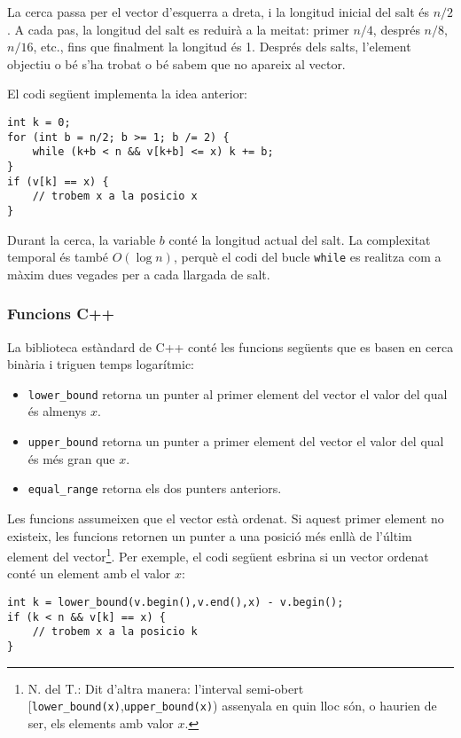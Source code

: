 La cerca passa per el vector d'esquerra a
dreta, i la longitud inicial del salt és $n/2$.
A cada pas, la longitud del salt es reduirà a la meitat:
primer $n/4$, després $n/8$, $n/16$, etc., fins que
finalment la longitud és 1.
Després dels salts, l'element objectiu o bé
s'ha trobat o bé sabem que no apareix al vector.

El codi següent implementa la idea anterior:
\begin{lstlisting}
int k = 0;
for (int b = n/2; b >= 1; b /= 2) {
    while (k+b < n && v[k+b] <= x) k += b;
}
if (v[k] == x) {
    // trobem x a la posicio x
}
\end{lstlisting}

Durant la cerca, la variable $b$
conté la longitud actual del salt.
La complexitat temporal és també $O(\log n)$,
perquè el codi del bucle \texttt{while}
es realitza com a màxim dues vegades per a cada llargada de salt.

\subsubsection{Funcions C++}

La biblioteca estàndard de C++ conté les funcions següents
que es basen en cerca binària i triguen temps logarítmic:

\begin{itemize}
\item \texttt{lower\_bound} retorna un punter al
primer element del vector el valor del qual és almenys $x$.
\item \texttt{upper\_bound} retorna un punter a
primer element del vector el valor del qual és més gran que $x$.
\item \texttt{equal\_range} retorna els dos punters anteriors.
\end{itemize}

Les funcions assumeixen que el vector està ordenat.
Si aquest primer element no existeix, les funcions retornen un
punter a una posició més enllà de l'últim element del vector\footnote{
N. del T.: Dit d'altra manera: l'interval semi-obert
[\texttt{lower\_bound(x)},\texttt{upper\_bound(x)})
  assenyala en quin lloc són, o haurien de ser, els elements amb
  valor $x$.}.
Per exemple, el codi següent esbrina si
un vector ordenat conté un element amb el valor $x$:

\begin{lstlisting}
int k = lower_bound(v.begin(),v.end(),x) - v.begin();
if (k < n && v[k] == x) {
    // trobem x a la posicio k
}
\end{lstlisting}

